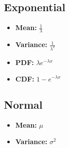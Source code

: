 \documentclass{article}
\begin{document}
\subsection*{Exponential}
\begin{itemize}
    \item \textbf{Mean:} \(\frac{1}{\lambda}\)
    \item \textbf{Variance:} \(\frac{1}{\lambda^2}\)
    \item \textbf{PDF:} \(\lambda e^{-\lambda x}\)
    \item \textbf{CDF:} \(1- e^{-\lambda x}\)
\end{itemize}
\subsection*{Normal}
\begin{itemize}
    \item \textbf{Mean:} \(\mu\)
    \item \textbf{Variance:} \(\sigma^2\)
\end{itemize}
\end{document}
